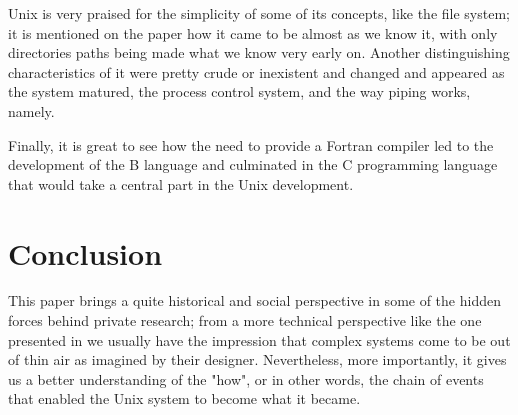 \documentclass[12pt]{article}
\begin{document}
Unix is very praised for the simplicity of some of its concepts, like the file system; it is mentioned on the paper how it came to be almost as we know it, with only directories paths being made what we know very early on. Another distinguishing characteristics of it were pretty crude or inexistent and changed and appeared as the system matured, the process control system, and the way piping works, namely.

Finally, it is great to see how the need to provide a Fortran compiler led to the development of the B language and culminated in the C programming language that would take a central part in the Unix development\cite{kernighan1988c}.


\section{Conclusion}
This paper brings a quite historical and social perspective in some of the hidden forces behind private research; from a more technical perspective like the one presented in \cite{ritchie1978unix} we usually have the impression that complex systems come to be out of thin air as imagined by their designer. Nevertheless, more importantly, it gives us a better understanding of the "how", or in other words, the chain of events that enabled the Unix system to become what it became. 



\end{document}
